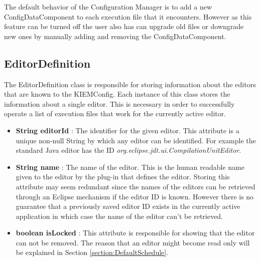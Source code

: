 The default behavior of the Configuration Manager is to add a new ConfigDataComponent to each execution file
that it encounters. However as this feature can be turned off the user also has can upgrade old files or
downgrade new ones by manually adding and removing the ConfigDataComponent.


\subsection{EditorDefinition}
\label{section:EditorDefinition}
The EditorDefinition class is responsible for storing information about the editors that are known to
the \ac{KIEMConfig}. Each instance of this class stores the information about a single editor. This is
necessary in order to successfully operate a list of execution files that work for the currently active
editor.
\begin{itemize}
 \item \textbf{String editorId} : The identifier for the given editor. This attribute is a unique non-null String
by which any editor can be identified. For example the standard Java editor has the ID \textit{org.eclipse.jdt.ui.CompilationUnitEditor}.
 \item \textbf{String name} : The name of the editor. This is the human readable name given to the editor
by the plug-in that defines the editor. Storing this attribute may seem redundant since the names of
the editors can be retrieved through an Eclipse mechanism if the editor ID is known. However there is no
guarantee that a previously saved editor ID exists in the currently active application in which case the name
of the editor can't be retrieved.
 \item \textbf{boolean isLocked} : This attribute is responsible for showing that the editor can not be removed.
The reason that an editor might become read only will be explained in Section \ref{section:DefaultSchedule}.
\end{itemize}

